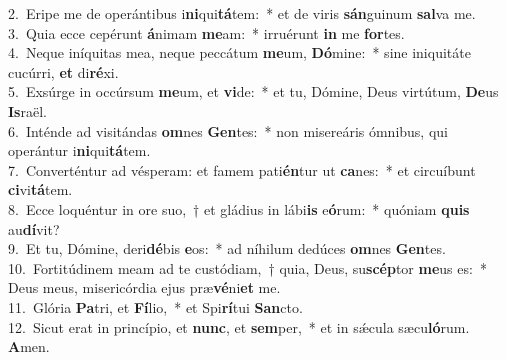 {2.~}Eripe me de operántibus i\textbf{ni}qui\textbf{tá}tem:~* et de viris \textbf{sán}guinum \textbf{sal}va me.\\
{3.~}Quia ecce cepérunt \textbf{á}nimam \textbf{me}am:~* irruérunt \textbf{in} me \textbf{for}tes.\\
{4.~}Neque iníquitas mea, neque peccátum \textbf{me}um, \textbf{Dó}mine:~* sine iniquitáte cucúrri, \textbf{et} di\textbf{ré}xi.\\
{5.~}Exsúrge in occúrsum \textbf{me}um, et \textbf{vi}de:~* et tu, Dómine, Deus virtútum, \textbf{De}us \textbf{Is}raël.\\
{6.~}Inténde ad visitándas \textbf{om}nes \textbf{Gen}tes:~* non misereáris ómnibus, qui operántur i\textbf{ni}qui\textbf{tá}tem.\\
{7.~}Converténtur ad vésperam: et famem pati\textbf{én}tur ut \textbf{ca}nes:~* et circuíbunt \textbf{ci}vi\textbf{tá}tem.\\
{8.~}Ecce loquéntur in ore suo,~† et gládius in lábi\textbf{is} e\textbf{ó}rum:~* quóniam \textbf{quis} au\textbf{dí}vit?\\
{9.~}Et tu, Dómine, deri\textbf{dé}bis \textbf{e}os:~* ad níhilum dedúces \textbf{om}nes \textbf{Gen}tes.\\
{10.~}Fortitúdinem meam ad te custódiam,~† quia, Deus, su\textbf{scép}tor \textbf{me}us es:~* Deus meus, misericórdia ejus præ\textbf{vé}ni\textbf{et} me.\\
{11.~}Glória \textbf{Pa}tri, et \textbf{Fí}lio,~* et Spi\textbf{rí}tui \textbf{San}cto.\\
{12.~}Sicut erat in princípio, et \textbf{nunc}, et \textbf{sem}per,~* et in sǽcula sæcu\textbf{ló}rum. \textbf{A}men.\\
